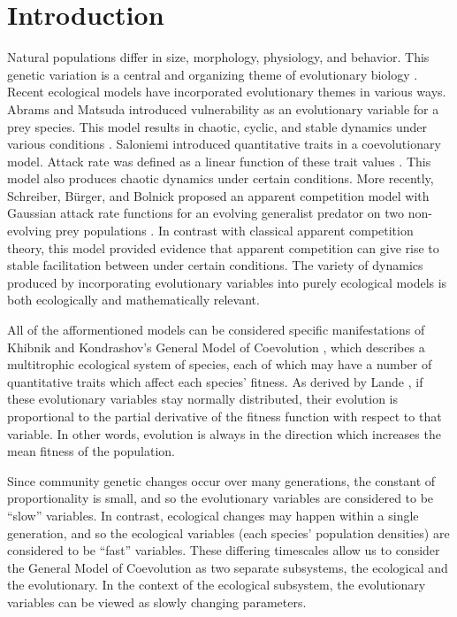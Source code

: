 \documentclass{amsart}
\theoremstyle{definition}
\theoremstyle{remark}
\numberwithin{equation}{section}
\begin{document}
\section{Introduction}

Natural populations differ in size, morphology, physiology, and behavior.  This genetic variation is a central and organizing theme of evolutionary biology \cite{Schreiber_2011}.  Recent ecological models have incorporated evolutionary themes in various ways.  Abrams and Matsuda introduced vulnerability as an evolutionary variable for a prey species.  This model results in chaotic, cyclic, and stable dynamics under various conditions \cite{Abrams_Matsuda_1997}.  Saloniemi introduced quantitative traits in a coevolutionary model.  Attack rate was defined as a linear function of these trait values \cite{Saloniemi_1993}.  This model also produces chaotic dynamics under certain conditions.  More recently, Schreiber, B\"urger, and Bolnick proposed an apparent competition model with Gaussian attack rate functions for an evolving generalist predator on two non-evolving prey populations \cite{Schreiber_2011}.  In contrast with classical apparent competition theory, this model provided evidence that apparent competition can give rise to stable facilitation between under certain conditions.  The variety of dynamics produced by incorporating evolutionary variables into purely ecological models is both ecologically and mathematically relevant.

All of the afformentioned models can be considered specific manifestations of Khibnik and Kondrashov's General Model of Coevolution \cite{Khibnik_Kondrashov_1997}, which describes a multitrophic ecological system of species, each of which may have a number of quantitative traits which affect each species' fitness.  As derived by Lande \cite{Lande_1976}, if these evolutionary variables stay normally distributed, their evolution is proportional to the partial derivative of the fitness function with respect to that variable.  In other words, evolution is always in the direction which increases the mean fitness of the population.

Since community genetic changes occur over many generations, the constant of proportionality is small, and so the evolutionary variables are considered to be ``slow'' variables.  In contrast, ecological changes may happen within a single generation, and so the ecological variables (each species' population densities) are considered to be ``fast'' variables.  These differing timescales allow us to consider the General Model of Coevolution as two separate subsystems, the ecological and the evolutionary.  In the context of the ecological subsystem, the evolutionary variables can be viewed as slowly changing parameters.
\end{document}
